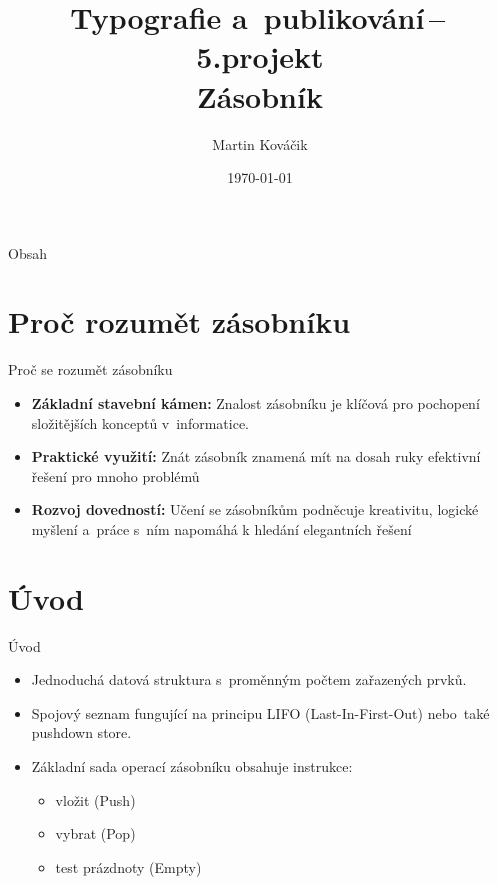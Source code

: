 \documentclass{beamer}
\title{Typografie a~publikování\,--\,5.projekt\\
Zásobník}
\author{Martin Kováčik}
\date{\today}
\begin{document}
\begin{frame}
  \titlepage
  \begin{figure}[h]
    \centering
\end{figure}
\end{frame}

\begin{frame}{Obsah}
  \tableofcontents
\end{frame}

\section{Proč rozumět zásobníku}
\begin{frame}{Proč se rozumět zásobníku}

  \begin{itemize}
      \item \textbf{Základní stavební kámen:} Znalost zásobníku je klíčová pro pochopení složitějších konceptů v~informatice.
        \item \textbf{Praktické využití:} Znát zásobník znamená mít na dosah ruky efektivní řešení pro mnoho problémů
            \item \textbf{Rozvoj dovedností:} Učení se zásobníkům podněcuje kreativitu, logické myšlení a~práce s~ním napomáhá k hledání elegantních řešení

\end{itemize}
\end{frame}

\section{Úvod}
\begin{frame}{Úvod}
  \begin{itemize}
      \item Jednoduchá datová struktura s~proměnným počtem zařazených prvků. 
        \item Spojový seznam fungující na principu LIFO (Last-In-First-Out) nebo~také pushdown store.
        \item Základní sada operací zásobníku obsahuje instrukce:\cite{wikisofia-datove-struktury}
        \begin{itemize}
            \item vložit (Push)
            \item vybrat (Pop)
            \item test prázdnoty (Empty)
        \end{itemize}
  \end{itemize}
\end{frame}
\end{document}
